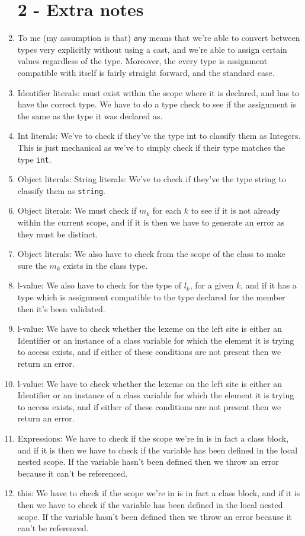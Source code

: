 \documentclass[11pt, oneside]{article}
\begin{document}
\begin{enumerate}
\section*{2 - Extra notes}

\item To me (my assumption is that) \texttt{any} means that we're able to convert between types very explicitly without using a cast, and we're able to assign certain values regardless of the type. Moreover, the every type is assignment compatible with itself is fairly straight forward, and the standard case. 
\item Identifier literals: must exist within the scope where it is declared, and has to have the correct type. We have to do a type check to see if the assignment is the same as the type it was declared as.
\item Int literals: We've to check if they've the type int to classify them as Integers. This is just mechanical as we've to simply check if their type matches the type \texttt{int}.
\item Object literals: String literals: We've to check if they've the type string to classify them as  \texttt{string}.
\item Object literals: We must check if $m_k$ for each $k$ to see if it is not already within the current scope, and if it is then we have to generate an error as they must be distinct.
\item Object literals: We also have to check from the scope of the class to make sure the $m_k$ exists in the class type.
\item l-value: We also have to check for the type of $l_k$, for a given $k$, and if it has a type which is assignment compatible to the type declared for the member then it's been validated.
\item l-value: We have to check whether the lexeme on the left site is either an Identifier or an instance of a class variable for which the element it is trying to access exists, and if either of these conditions are not present then we return an error.
\item l-value: We have to check whether the lexeme on the left site is either an Identifier or an instance of a class variable for which the element it is trying to access exists, and if either of these conditions are not present then we return an error.
\item Expressions: We have to check if the scope we're in is in fact a class block, and if it is then we have to check if the variable has been defined in the local nested scope. If the variable hasn't been defined then we throw an error because it can't be referenced.
\item this: We have to check if the scope we're in is in fact a class block, and if it is then we have to check if the variable has been defined in the local nested scope. If the variable hasn't been defined then we throw an error because it can't be referenced.
\end{enumerate}
\end{document}
